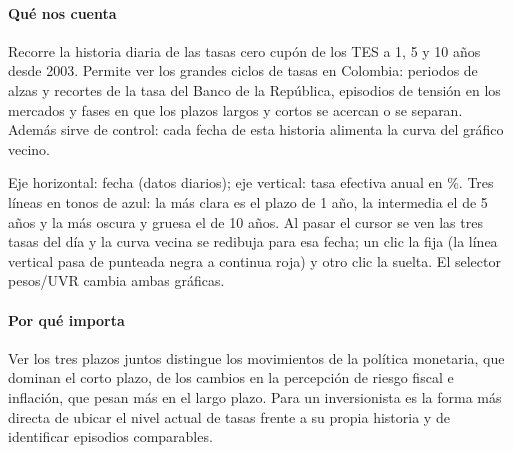 \paragraph{Qué nos cuenta}
Recorre la historia diaria de las tasas cero cupón de los TES a 1, 5 y 10 años desde 2003. Permite ver los grandes ciclos de tasas en Colombia: periodos de alzas y recortes de la tasa del Banco de la República, episodios de tensión en los mercados y fases en que los plazos largos y cortos se acercan o se separan. Además sirve de control: cada fecha de esta historia alimenta la curva del gráfico vecino.

\begin{leer}
Eje horizontal: fecha (datos diarios); eje vertical: tasa efectiva anual en \%. Tres líneas en tonos de azul: la más clara es el plazo de 1 año, la intermedia el de 5 años y la más oscura y gruesa el de 10 años. Al pasar el cursor se ven las tres tasas del día y la curva vecina se redibuja para esa fecha; un clic la fija (la línea vertical pasa de punteada negra a continua roja) y otro clic la suelta. El selector pesos/UVR cambia ambas gráficas.
\end{leer}

\paragraph{Por qué importa}
Ver los tres plazos juntos distingue los movimientos de la política monetaria, que dominan el corto plazo, de los cambios en la percepción de riesgo fiscal e inflación, que pesan más en el largo plazo. Para un inversionista es la forma más directa de ubicar el nivel actual de tasas frente a su propia historia y de identificar episodios comparables.

